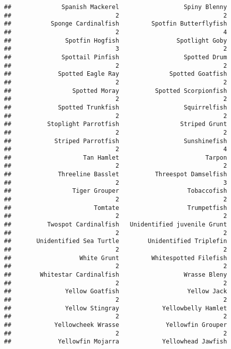 \documentclass[
]{article}
\begin{document}
\begin{verbatim}
##              Spanish Mackerel                  Spiny Blenny 
##                             2                             2 
##           Sponge Cardinalfish         Spotfin Butterflyfish 
##                             2                             4 
##               Spotfin Hogfish                Spotlight Goby 
##                             3                             2 
##              Spottail Pinfish                  Spotted Drum 
##                             2                             2 
##             Spotted Eagle Ray              Spotted Goatfish 
##                             2                             2 
##                 Spotted Moray          Spotted Scorpionfish 
##                             2                             2 
##             Spotted Trunkfish                  Squirrelfish 
##                             2                             2 
##          Stoplight Parrotfish                 Striped Grunt 
##                             2                             2 
##            Striped Parrotfish                  Sunshinefish 
##                             2                             4 
##                    Tan Hamlet                        Tarpon 
##                             2                             2 
##             Threeline Basslet          Threespot Damselfish 
##                             2                             3 
##                 Tiger Grouper                   Tobaccofish 
##                             2                             2 
##                       Tomtate                   Trumpetfish 
##                             2                             2 
##          Twospot Cardinalfish   Unidentified juvenile Grunt 
##                             2                             2 
##       Unidentified Sea Turtle        Unidentified Triplefin 
##                             2                             2 
##                   White Grunt         Whitespotted Filefish 
##                             2                             2 
##        Whitestar Cardinalfish                  Wrasse Bleny 
##                             2                             2 
##               Yellow Goatfish                   Yellow Jack 
##                             2                             2 
##               Yellow Stingray            Yellowbelly Hamlet 
##                             2                             2 
##            Yellowcheek Wrasse             Yellowfin Grouper 
##                             2                             2 
##             Yellowfin Mojarra            Yellowhead Jawfish 

\end{verbatim}
\end{document}
